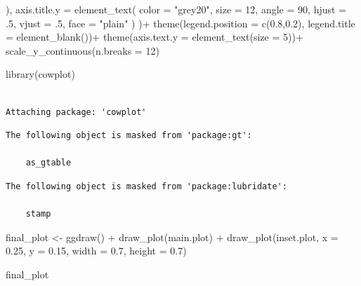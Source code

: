 \documentclass[
  12pt,
  letterpaper,
]{book}
\newenvironment{Shaded}{\begin{snugshade}}{\end{snugshade}}
\newcommand{\AttributeTok}[1]{\textcolor[rgb]{0.40,0.45,0.13}{#1}}
\newcommand{\DecValTok}[1]{\textcolor[rgb]{0.68,0.00,0.00}{#1}}
\newcommand{\FloatTok}[1]{\textcolor[rgb]{0.68,0.00,0.00}{#1}}
\newcommand{\FunctionTok}[1]{\textcolor[rgb]{0.28,0.35,0.67}{#1}}
\newcommand{\NormalTok}[1]{\textcolor[rgb]{0.00,0.23,0.31}{#1}}
\newcommand{\OtherTok}[1]{\textcolor[rgb]{0.00,0.23,0.31}{#1}}
\newcommand{\SpecialCharTok}[1]{\textcolor[rgb]{0.37,0.37,0.37}{#1}}
\newcommand{\StringTok}[1]{\textcolor[rgb]{0.13,0.47,0.30}{#1}}
\begin{document}
\begin{Shaded}
\begin{Highlighting}[]
\NormalTok{    ),}
    \AttributeTok{axis.title.y =} \FunctionTok{element\_text}\NormalTok{(}
      \AttributeTok{color =} \StringTok{"grey20"}\NormalTok{,}
      \AttributeTok{size =} \DecValTok{12}\NormalTok{,}
      \AttributeTok{angle =} \DecValTok{90}\NormalTok{,}
      \AttributeTok{hjust =}\NormalTok{ .}\DecValTok{5}\NormalTok{,}
      \AttributeTok{vjust =}\NormalTok{ .}\DecValTok{5}\NormalTok{,}
      \AttributeTok{face =} \StringTok{"plain"}
\NormalTok{    )}
\NormalTok{  )}\SpecialCharTok{+}
  \FunctionTok{theme}\NormalTok{(}\AttributeTok{legend.position =} \FunctionTok{c}\NormalTok{(}\FloatTok{0.8}\NormalTok{,}\FloatTok{0.2}\NormalTok{),}
        \AttributeTok{legend.title =} \FunctionTok{element\_blank}\NormalTok{())}\SpecialCharTok{+}
  \FunctionTok{theme}\NormalTok{(}\AttributeTok{axis.text.y =} \FunctionTok{element\_text}\NormalTok{(}\AttributeTok{size =} \DecValTok{5}\NormalTok{))}\SpecialCharTok{+}
  \FunctionTok{scale\_y\_continuous}\NormalTok{(}\AttributeTok{n.breaks =} \DecValTok{12}\NormalTok{)}

\FunctionTok{library}\NormalTok{(cowplot)}
\end{Highlighting}
\end{Shaded}

\begin{verbatim}

Attaching package: 'cowplot'
\end{verbatim}

\begin{verbatim}
The following object is masked from 'package:gt':

    as_gtable
\end{verbatim}

\begin{verbatim}
The following object is masked from 'package:lubridate':

    stamp
\end{verbatim}

\begin{Shaded}
\begin{Highlighting}[]
\NormalTok{final\_plot }\OtherTok{\textless{}{-}} \FunctionTok{ggdraw}\NormalTok{() }\SpecialCharTok{+}
  \FunctionTok{draw\_plot}\NormalTok{(main.plot) }\SpecialCharTok{+}
  \FunctionTok{draw\_plot}\NormalTok{(inset.plot, }\AttributeTok{x =} \FloatTok{0.25}\NormalTok{, }\AttributeTok{y =} \FloatTok{0.15}\NormalTok{, }\AttributeTok{width =} \FloatTok{0.7}\NormalTok{, }\AttributeTok{height =} \FloatTok{0.7}\NormalTok{)}

\NormalTok{final\_plot}
\end{Highlighting}
\end{Shaded}
\end{document}
